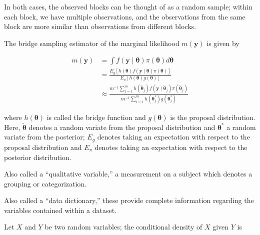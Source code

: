 \documentclass[
  letterpaper,
  DIV=11,
  numbers=noendperiod]{scrreprt}
\providecommand{\tightlist}{%
  \setlength{\itemsep}{0pt}\setlength{\parskip}{0pt}}\usepackage{longtable,booktabs,array}
\theoremstyle{definition}
\theoremstyle{definition}
\theoremstyle{plain}
\theoremstyle{remark}
\begin{document}
In both cases, the observed blocks can be thought of as a random sample;
within each block, we have multiple observations, and the observations
from the same block are more similar than observations from different
blocks.

\begin{description}
\tightlist
\item[Bridge Sampling (Definition~\ref{def-bridge-sampling})]
The bridge sampling estimator of the marginal likelihood
\(m(\mathbf{y})\) is given by
\end{description}

\[
\begin{aligned}
  m(\mathbf{y}) 
    &= \int f(\mathbf{y} \mid \boldsymbol{\theta}) \pi(\boldsymbol{\theta}) d\boldsymbol{\theta} \\
    &= \frac{E_g\left[h(\boldsymbol{\theta}) f(\mathbf{y} \mid \boldsymbol{\theta}) \pi(\boldsymbol{\theta})\right]}{E_{\pi}\left[h(\boldsymbol{\theta}) g(\boldsymbol{\theta}) \right]} \\
    &\approx \frac{m^{-1}\sum_{j=1}^{m} h\left(\tilde{\boldsymbol{\theta}}_j\right) f\left(\mathbf{y} \mid \tilde{\boldsymbol{\theta}}_j\right) \pi\left(\tilde{\boldsymbol{\theta}}_j\right)}{m^{-1}\sum_{i=1}^{m} h\left(\boldsymbol{\theta}^*_j\right) g\left(\boldsymbol{\theta}^*_j\right)}
\end{aligned}
\]

where \(h(\boldsymbol{\theta})\) is called the bridge function and
\(g(\boldsymbol{\theta})\) is the proposal distribution. Here,
\(\tilde{\boldsymbol{\theta}}\) denotes a random variate from the
proposal distribution and \(\boldsymbol{\theta}^*\) a random variate
from the posterior; \(E_g\) denotes taking an expectation with respect
to the proposal distribution and \(E_\pi\) denotes taking an expectation
with respect to the posterior distribution.

\begin{description}
\tightlist
\item[Categorical Variable (Definition~\ref{def-categorical})]
Also called a ``qualitative variable,'' a measurement on a subject which
denotes a grouping or categorization.
\item[Codebook (Definition~\ref{def-codebook})]
Also called a ``data dictionary,'' these provide complete information
regarding the variables contained within a dataset.
\item[Conditional Density (Definition~\ref{def-conditional-density})]
Let \(X\) and \(Y\) be two random variables; the conditional density of
\(X\) given \(Y\) is
\end{description}
\end{document}
